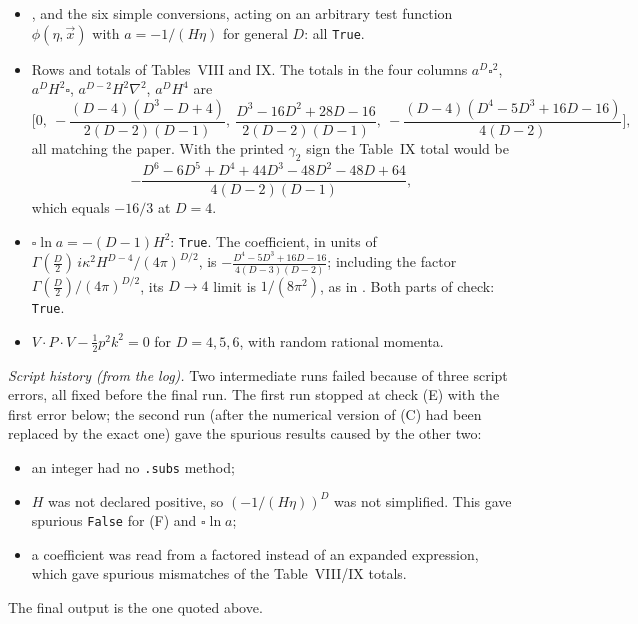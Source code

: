 \begin{itemize}[leftmargin=*,itemsep=3pt]
\item[(F)] ,  and the six simple conversions, acting on an arbitrary test function $\phi(\eta,\vec x)$ with $a=-1/(H\eta)$ for general $D$: all \texttt{True}.
\item[(G)] Rows and totals of Tables~VIII and IX. The totals in the four columns $a^D\square^2$, $a^DH^2\square$, $a^{D-2}H^2\nabla^2$, $a^DH^4$ are
\[
\Big[0,\ -\frac{(D-4)(D^3-D+4)}{2(D-2)(D-1)},\ \frac{D^3-16D^2+28D-16}{2(D-2)(D-1)},\ -\frac{(D-4)(D^4-5D^3+16D-16)}{4(D-2)}\Big],
\]
all matching the paper. With the printed $\gamma_2$ sign the Table~IX total would be
\[
-\frac{D^6-6D^5+D^4+44D^3-48D^2-48D+64}{4(D-2)(D-1)},
\]
which equals $-16/3$ at $D=4$.
\item[(H)] $\square\ln a=-(D-1)H^2$: \texttt{True}. The  coefficient, in units of $\Gamma(\frac D2)\,i\kappa^2H^{D-4}/(4\pi)^{D/2}$, is $-\frac{D^4-5D^3+16D-16}{4(D-3)(D-2)}$; including the factor $\Gamma(\frac D2)/(4\pi)^{D/2}$, its $D\to4$ limit is $1/(8\pi^2)$, as in .
Both parts of  check: \texttt{True}.
\item[(I)] $V\!\cdot\!P\!\cdot\!V-\frac12p^2k^2=0$ for $D=4,5,6$, with random rational momenta.
\end{itemize}
\emph{Script history (from the log).} Two intermediate runs failed because of three script errors, all fixed before the final run.
The first run stopped at check (E) with the first error below; the second run (after the numerical version of (C) had been replaced by the exact one) gave the spurious results caused by the other two:
\begin{itemize}[itemsep=0pt]
\item an integer had no \texttt{.subs} method;
\item $H$ was not declared positive, so $(-1/(H\eta))^D$ was not simplified. This gave spurious \texttt{False} for (F) and $\square\ln a$;
\item a coefficient was read from a factored instead of an expanded expression, which gave spurious mismatches of the Table~VIII/IX totals.
\end{itemize}
The final output is the one quoted above.


